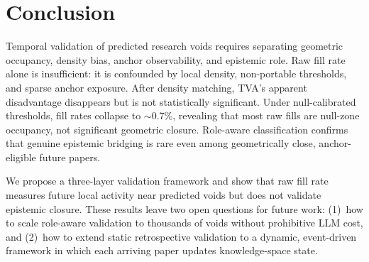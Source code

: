 \documentclass[sigconf]{acmart}
\newcommand{\tva}{\textsf{TVA}}
\begin{document}
\section{Conclusion}
\label{sec:conclusion}

Temporal validation of predicted research voids requires separating geometric
occupancy, density bias, anchor observability, and epistemic role.
Raw fill rate alone is insufficient: it is confounded by local density, non-portable
thresholds, and sparse anchor exposure.
After density matching, \tva{}'s apparent disadvantage disappears but is not
statistically significant.
Under null-calibrated thresholds, fill rates collapse to $\sim$0.7\%, revealing that
most raw fills are null-zone occupancy, not significant geometric closure.
Role-aware classification confirms that genuine epistemic bridging is rare even among
geometrically close, anchor-eligible future papers.

We propose a three-layer validation framework and show that raw fill rate measures
future local activity near predicted voids but does not validate epistemic closure.
These results leave two open questions for future work: (1)~how to scale role-aware
validation to thousands of voids without prohibitive LLM cost, and (2)~how to extend
static retrospective validation to a dynamic, event-driven framework in which each
arriving paper updates knowledge-space state.



\end{document}

